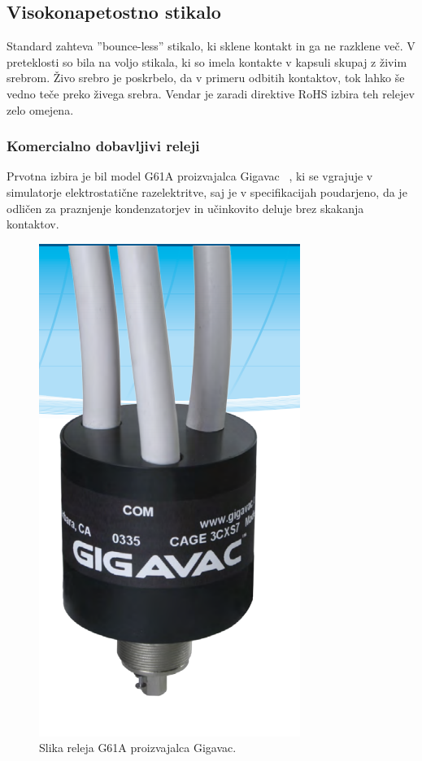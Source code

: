 \documentclass[a4paper,twoside,openright,12pt,Slovene]{book}
\begin{document}
	\subsection{Visokonapetostno stikalo} \label{Visokonapetostno stikalo}
	Standard zahteva ''bounce-less'' stikalo, ki sklene kontakt in ga ne razklene več. V preteklosti so bila na voljo stikala, ki so imela kontakte v kapsuli skupaj z živim srebrom. Živo srebro je poskrbelo, da v primeru odbitih kontaktov, tok lahko še vedno teče preko živega srebra. Vendar je zaradi direktive RoHS izbira teh relejev zelo omejena.
	
	\subsubsection{Komercialno dobavljivi releji} \label{Komercialno dobavljivi releji}
     Prvotna izbira je bil model G61A proizvajalca Gigavac ~\cite{Gigavac:G61A}, ki se vgrajuje v simulatorje elektrostatične razelektritve, saj je v specifikacijah poudarjeno, da je odličen za praznjenje kondenzatorjev in učinkovito deluje brez skakanja kontaktov.
    
    \begin{figure}[H]
        \centering
        \includegraphics[width=0.5\columnwidth]{Slike/GigavacG61C.png}
        \caption{\label{GigavacG61C} Slika releja G61A proizvajalca Gigavac.}
    \end{figure}    
    
\end{document}
